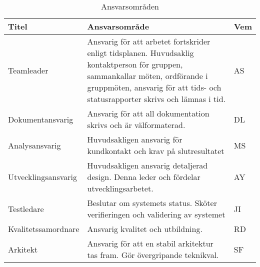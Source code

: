 \begin{table}[h]
  \centering
    \begin{tabularx}{\textwidth}{| l | X | l |}
      \hline
      \textbf{Titel} & \textbf{Ansvarsområde} & \textbf{Vem} \\
      \hline
      {Teamleader} & {Ansvarig för att arbetet fortskrider enligt tidsplanen. Huvudsaklig kontaktperson för gruppen, sammankallar möten, ordförande i gruppmöten, ansvarig för att tids- och statusrapporter skrivs och lämnas i tid.} & {AS} \\\hline
      
      {Dokumentansvarig} & {Ansvarig för att all dokumentation skrivs och är välformaterad.} & {DL} \\\hline
      
      {Analysansvarig} & {Huvudsakligen ansvarig för kundkontakt och krav på slutresultatet} & {MS} \\\hline
      
      {Utvecklingsansvarig} & {Huvudsakligen ansvarig detaljerad design. Denna leder och fördelar utvecklingsarbetet. } & {AY} \\\hline
      
      {Testledare} & {Beslutar om systemets status. Sköter verifieringen och validering av systemet} & {JI} \\\hline
      
      {Kvalitetssamordnare} & {Ansvarig kvalitet och utbildning.} & {RD} \\\hline
      
        {Arkitekt} & {Ansvarig för att en stabil arkitektur tas fram. Gör övergripande teknikval. } & {SF} \\\hline
    \end{tabularx}
  \caption{Ansvarsområden} \label{projektplan:ansvarsomraden}
\end{table}
